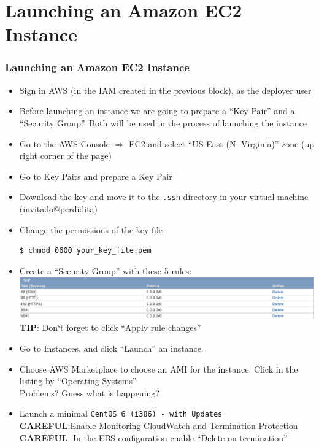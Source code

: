 \documentclass{beamer}
\newcommand{\comment}[2]{#2}
\begin{document}
\section{Launching an Amazon EC2 Instance}
\begin{frame}
\frametitle{Launching an Amazon EC2 Instance}

\begin{itemize}

\item Sign in AWS (in the IAM created in the previous block), as the deployer user
\item Before launching an instance we are going to prepare a ``Key Pair'' and a ``Security Group''. Both will be used in the process
of launching the instance
\item Go to the AWS Console $\Rightarrow$ EC2 and select ``US East (N. Virginia)'' zone (up right corner of the page)
\item Go to Key Pairs and prepare a Key Pair
\item Download the key and move it to the \texttt{.ssh} directory in your virtual machine (invitado@perdidita)
\item Change the permissions of the key file
\lstset{language=shell, numbers=none}
\begin{lstlisting}[escapechar=!]
$ chmod 0600 your_key_file.pem 
\end{lstlisting}
\item Create a ``Security Group'' with these 5 rules:
 \includegraphics[width=1.0 \textwidth]{securitygroup.eps}
\textbf{TIP}: Don`t forget to click ``Apply rule changes''
\item Go to Instances, and click ``Launch'' an instance.
\item Choose AWS Marketplace to choose an AMI for the instance. Click in the listing by ``Operating Systems''\\
 Problems? Guess what is happening?
\item Launch a minimal \texttt{CentOS 6 (i386) - with Updates} \\
\comment{in \url{https://aws.amazon.com/marketplace/pp/B00A6KZBC6/ref=sp_mpg_product_title?ie=UTF8&sr=0-2}}
\textbf{CAREFUL}:Enable Monitoring CloudWatch and Termination Protection\\
\textbf{CAREFUL}: In the EBS configuration enable ``Delete on termination''


\end{itemize}
\end{frame}
\end{document}
